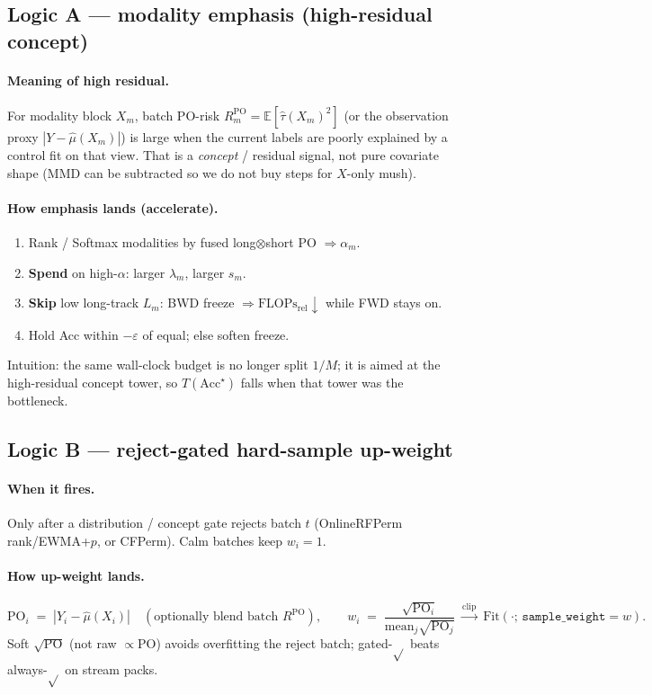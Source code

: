 \documentclass[11pt]{article}
\newcommand{\PO}{\mathrm{PO}}
\newcommand{\E}{\mathbb{E}}
\newcommand{\Acc}{\mathrm{Acc}}
\newcommand{\Flops}{\mathrm{FLOPs}_{\mathrm{rel}}}
\begin{document}
\subsection{Logic A --- modality emphasis (high-residual concept)}
\label{sec:logicA}

\paragraph{Meaning of high residual.}
For modality block $X_m$, batch PO-risk
$R^{\PO}_m=\E[\hat\tau(X_m)^2]$ (or the observation proxy
$|Y-\hat\mu(X_m)|$) is large when the current labels are poorly
explained by a control fit on that view.
That is a \emph{concept} / residual signal, not pure covariate shape
(MMD can be subtracted so we do not buy steps for $X$-only mush).

\paragraph{How emphasis lands (accelerate).}
\begin{enumerate}[leftmargin=1.4em,itemsep=2pt]
  \item Rank / Softmax modalities by fused long$\otimes$short $\PO$
        $\Rightarrow\alpha_m$.
  \item \textbf{Spend} on high-$\alpha$: larger $\lambda_m$, larger $s_m$.
  \item \textbf{Skip} low long-track $L_m$: BWD freeze
        $\Rightarrow\Flops\downarrow$ while FWD stays on.
  \item Hold Acc within $-\varepsilon$ of equal; else soften freeze.
\end{enumerate}
Intuition: the same wall-clock budget is no longer split $1/M$; it is
aimed at the high-residual concept tower, so $T(\Acc^\star)$ falls
when that tower was the bottleneck.

\subsection{Logic B --- reject-gated hard-sample up-weight}
\label{sec:logicB}

\paragraph{When it fires.}
Only after a distribution / concept gate rejects batch $t$
(OnlineRFPerm rank/EWMA+$p$, or CFPerm). Calm batches keep $w_i=1$.

\paragraph{How up-weight lands.}
\[
  \PO_i \;=\; |Y_i-\hat\mu(X_i)|
  \quad(\text{optionally blend batch }R^{\PO}),
  \qquad
  w_i \;=\; \frac{\sqrt{\PO_i}}{\mathrm{mean}_j\sqrt{\PO_j}}
  \;\xrightarrow{\mathrm{clip}}\;
  \mathrm{Fit}(\cdot;\,\texttt{sample\_weight}=w).
\]
Soft $\sqrt{\PO}$ (not raw $\propto\PO$) avoids overfitting the reject
batch; gated-$\sqrt{}$ beats always-$\sqrt{}$ on stream packs.
\end{document}
